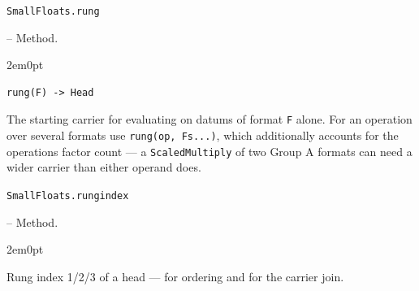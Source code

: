 \par\medskip\noindent\begin{minipage}{\linewidth}
\hypertarget{18216053183491810250}{\texttt{SmallFloats.rung}}  -- {Method.}
\nopagebreak
\begin{adjustwidth}{2em}{0pt}


\begin{verbatim}
rung(F) -> Head
\end{verbatim}

The starting carrier for evaluating on datums of format \texttt{F} alone. For an operation over several formats use \texttt{rung(op, Fs...)}, which additionally accounts for the operation{\textquotesingle}s factor count — a \texttt{ScaledMultiply} of two Group A formats can need a wider carrier than either operand does.



\end{adjustwidth}
\end{minipage}
\par\medskip

\par\medskip\noindent\begin{minipage}{\linewidth}
\hypertarget{5631300055872342420}{\texttt{SmallFloats.rungindex}}  -- {Method.}
\nopagebreak
\begin{adjustwidth}{2em}{0pt}

Rung index 1/2/3 of a head — for ordering and for the carrier join.



\end{adjustwidth}
\end{minipage}
\par\medskip


